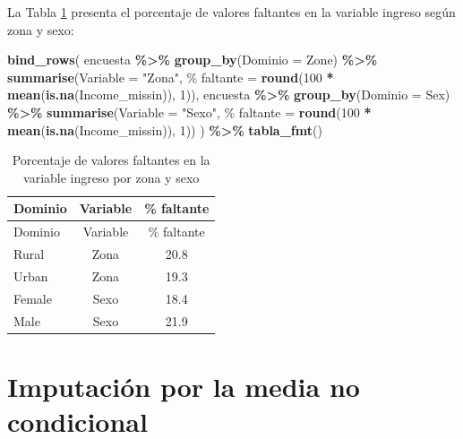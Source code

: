 \documentclass[
  spanish,
  12pt,
]{book}
\newenvironment{Shaded}{\begin{snugshade}}{\end{snugshade}}
\newcommand{\AttributeTok}[1]{\textcolor[rgb]{0.13,0.29,0.53}{#1}}
\newcommand{\DecValTok}[1]{\textcolor[rgb]{0.00,0.00,0.81}{#1}}
\newcommand{\FunctionTok}[1]{\textcolor[rgb]{0.13,0.29,0.53}{\textbf{#1}}}
\newcommand{\NormalTok}[1]{#1}
\newcommand{\OtherTok}[1]{\textcolor[rgb]{0.56,0.35,0.01}{#1}}
\newcommand{\SpecialCharTok}[1]{\textcolor[rgb]{0.81,0.36,0.00}{\textbf{#1}}}
\newcommand{\StringTok}[1]{\textcolor[rgb]{0.31,0.60,0.02}{#1}}
\begin{document}
La Tabla \ref{tab:tab-porcentaje-faltantes} presenta el porcentaje de valores faltantes en la variable ingreso según zona y sexo:

\begin{Shaded}
\begin{Highlighting}[]
\FunctionTok{bind\_rows}\NormalTok{(}
\NormalTok{  encuesta }\SpecialCharTok{\%\textgreater{}\%} \FunctionTok{group\_by}\NormalTok{(}\AttributeTok{Dominio =}\NormalTok{ Zone) }\SpecialCharTok{\%\textgreater{}\%}
    \FunctionTok{summarise}\NormalTok{(}\AttributeTok{Variable =} \StringTok{"Zona"}\NormalTok{,}
              \StringTok{\textasciigrave{}}\AttributeTok{\% faltante}\StringTok{\textasciigrave{}} \OtherTok{=} \FunctionTok{round}\NormalTok{(}\DecValTok{100} \SpecialCharTok{*} \FunctionTok{mean}\NormalTok{(}\FunctionTok{is.na}\NormalTok{(Income\_missin)), }\DecValTok{1}\NormalTok{)),}
\NormalTok{  encuesta }\SpecialCharTok{\%\textgreater{}\%} \FunctionTok{group\_by}\NormalTok{(}\AttributeTok{Dominio =}\NormalTok{ Sex) }\SpecialCharTok{\%\textgreater{}\%}
    \FunctionTok{summarise}\NormalTok{(}\AttributeTok{Variable =} \StringTok{"Sexo"}\NormalTok{,}
              \StringTok{\textasciigrave{}}\AttributeTok{\% faltante}\StringTok{\textasciigrave{}} \OtherTok{=} \FunctionTok{round}\NormalTok{(}\DecValTok{100} \SpecialCharTok{*} \FunctionTok{mean}\NormalTok{(}\FunctionTok{is.na}\NormalTok{(Income\_missin)), }\DecValTok{1}\NormalTok{))}
\NormalTok{) }\SpecialCharTok{\%\textgreater{}\%} \FunctionTok{tabla\_fmt}\NormalTok{()}
\end{Highlighting}
\end{Shaded}

\begin{longtable}[]{@{}lcc@{}}
\caption{\label{tab:tab-porcentaje-faltantes}Porcentaje de valores faltantes en la variable ingreso por zona y sexo}\tabularnewline
\toprule\noalign{}
Dominio & Variable & \% faltante \\
\midrule\noalign{}
\endfirsthead
\toprule\noalign{}
Dominio & Variable & \% faltante \\
\midrule\noalign{}
\endhead
\bottomrule\noalign{}
\endlastfoot
Rural & Zona & 20.8 \\
Urban & Zona & 19.3 \\
Female & Sexo & 18.4 \\
Male & Sexo & 21.9 \\
\end{longtable}

\section{Imputación por la media no condicional}\label{sec-media-incondicional}
\end{document}
